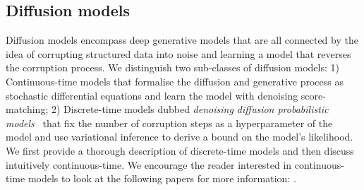 \subsection{Diffusion models}
Diffusion models encompass deep generative models that are all connected by the idea of corrupting structured data into noise and learning a model that reverses the corruption process. We distinguish two sub-classes of diffusion models: 1) Continuous-time models \citep{song_generative_2019, song2020score} that formalise the diffusion and generative process as stochastic differential equations and learn the model with denoising score-matching; 2) Discrete-time models dubbed \textit{denoising diffusion probabilistic models}~\citep[DDPM][]{sohl-dickstein_deep_2015, ho_denoising_2020} that fix the number of corruption steps as a hyperparameter of the model and use variational inference to derive a bound on the model's likelihood. We first provide a thorough description of discrete-time models and then discuss intuitively continuous-time. We encourage the reader interested in continuous-time models to look at the following papers for more information: \citep{song_generative_2019, song2020score, song2021maximum, dockhorn2021score}.

